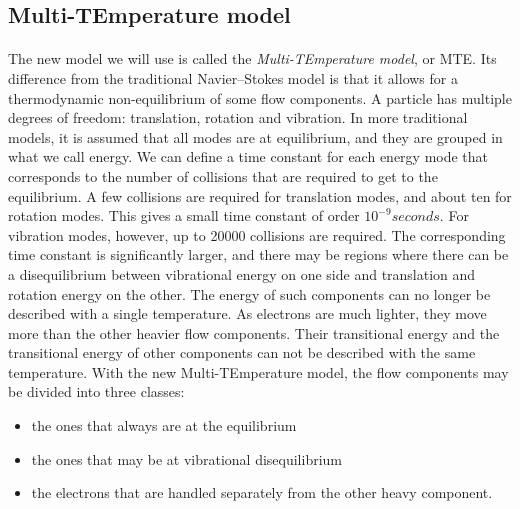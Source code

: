    \subsection{Multi-TEmperature model}

      \paragraph{}
      The new model we will use is called the \emph{Multi-TEmperature model}, or MTE.
      Its difference from the traditional Navier--Stokes model is that it allows for a thermodynamic non-equilibrium of some flow components.
      A particle has multiple degrees of freedom: translation, rotation and vibration.
      In more traditional models, it is assumed that all modes are at equilibrium, and they are grouped in what we call energy.
      We can define a time constant for each energy mode that corresponds to the number of collisions that are required to get to the equilibrium.
      A few collisions are required for translation modes, and about ten for rotation modes.
      This gives a small time constant of order $10^{-9}\si{seconds}$.
      For vibration modes, however, up to \num{20000} collisions are required.
      The corresponding time constant is significantly larger, and there may be regions where there can be a disequilibrium between vibrational energy on one side and translation and rotation energy on the other.
      The energy of such components can no longer be described with a single temperature.
      As electrons are much lighter, they move more than the other heavier flow components.
      Their transitional energy and the transitional energy of other components can not be described with the same temperature.
      With the new Multi-TEmperature model, the flow components may be divided into three classes:
      \begin{itemize}
        \item the ones that always are at the equilibrium
        \item the ones that may be at vibrational disequilibrium
        \item the electrons that are handled separately from the other heavy component.
      \end{itemize}

